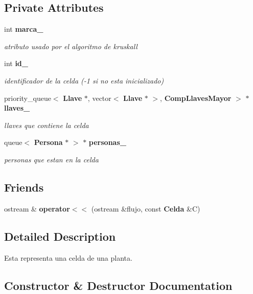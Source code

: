 \subsection*{Private Attributes}
\begin{CompactItemize}
\item 
int {\bf marca\_\-}
\begin{CompactList}\small\item\em atributo usado por el algoritmo de kruskall \item\end{CompactList}\item 
int {\bf id\_\-}
\begin{CompactList}\small\item\em identificador de la celda (-1 si no esta inicializado) \item\end{CompactList}\item 
priority\_\-queue$<$ {\bf Llave} $\ast$, vector$<$ {\bf Llave} $\ast$ $>$, {\bf CompLlavesMayor} $>$ $\ast$ {\bf llaves\_\-}
\begin{CompactList}\small\item\em llaves que contiene la celda \item\end{CompactList}\item 
queue$<$ {\bf Persona} $\ast$ $>$ $\ast$ {\bf personas\_\-}
\begin{CompactList}\small\item\em personas que estan en la celda \item\end{CompactList}\end{CompactItemize}
\subsection*{Friends}
\begin{CompactItemize}
\item 
ostream \& {\bf operator$<$$<$} (ostream \&flujo, const {\bf Celda} \&C)
\end{CompactItemize}


\subsection{Detailed Description}
Esta representa una celda de una planta. 



\subsection{Constructor \& Destructor Documentation}
